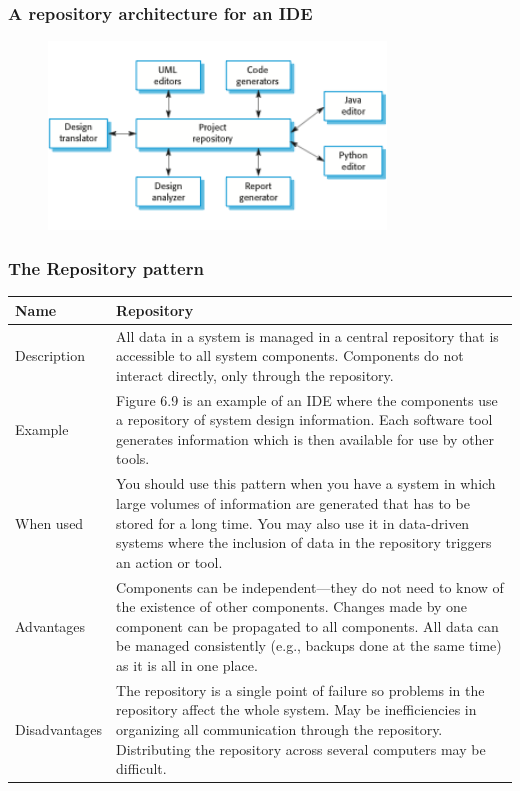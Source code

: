 \subsubsection{A repository architecture for an IDE}
\begin{figure}[h!]
    \centering
    \includegraphics[width = 0.8\textwidth]{./figures/L3_6.png}
    \caption{}
    \label{fig:L3_6}
\end{figure}
\newpage
\subsubsection{The Repository pattern}


\begin{table}[h!]
\centering
\begin{tabular}{ |p{3cm}|p{8cm}|  }
\hline
Name & Repository\\
\hline
\hline
Description & All data in a system is managed in a central repository that is accessible to all system components. Components do not interact directly, only through the repository.\\
\hline
Example & Figure 6.9 is an example of an IDE where the components use a repository of system design information. Each software tool generates information which is then available for use by other tools.\\
\hline
When used & You should use this pattern when you have a system in which large volumes of information are generated that has to be stored for a long time. You may also use it in data-driven systems where the inclusion of data in the repository triggers an action or tool.\\
\hline
Advantages & Components can be independent—they do not need to know of the existence of other components. Changes made by one component can be propagated to all components. All data can be managed consistently (e.g., backups done at the same time) as it is all in one place.\\
\hline
Disadvantages & The repository is a single point of failure so problems in the repository affect the whole system. May be inefficiencies in organizing all communication through the repository. Distributing the repository across several computers may be difficult.\\
\hline
\end{tabular}

\label{table:T2_3}
\end{table}



